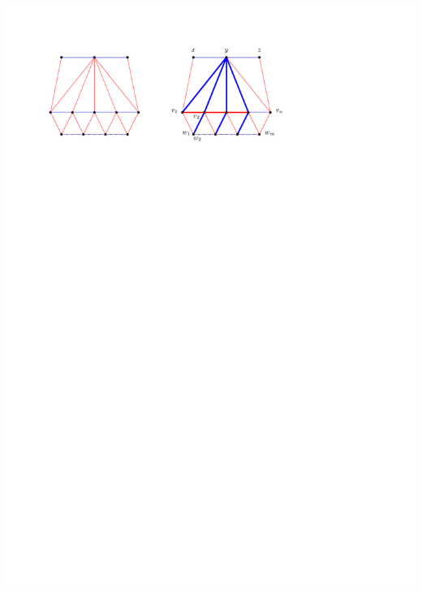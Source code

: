 \documentclass[a4paper]{article}
\begin{document}
\includegraphics[width = \textwidth]{topFanFlips/img/regular}
\clearpage%
\end{document}
